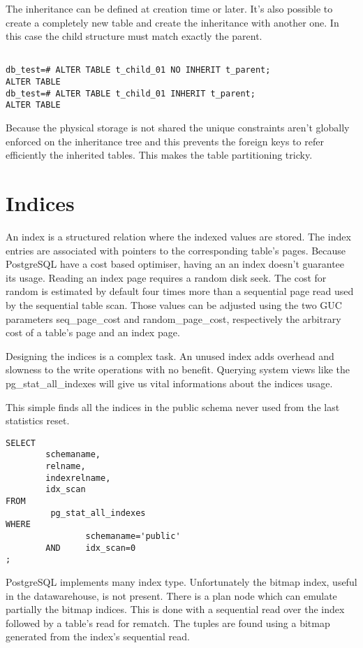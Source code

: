 The inheritance can be defined at creation time or later. It's also possible to create a completely 
new table and create the inheritance with another one. In this case the child structure must match 
exactly the parent.

\begin{lstlisting}[style=pgsql]

db_test=# ALTER TABLE t_child_01 NO INHERIT t_parent;
ALTER TABLE
db_test=# ALTER TABLE t_child_01 INHERIT t_parent;
ALTER TABLE

\end{lstlisting}

Because the physical storage is not shared the unique constraints aren't globally enforced on the 
inheritance tree and this prevents the foreign keys to refer efficiently the inherited tables. This 
makes the table partitioning tricky.

\section{Indices}
An index is a structured relation where the indexed values are stored. The index entries are 
associated with pointers to the corresponding table's pages. Because PostgreSQL have a cost based 
optimiser, having an an index doesn't guarantee its usage. Reading an index page requires a random
disk seek. The cost for random is estimated by default four times more than a sequential page read
used by the sequential table scan. Those values can be adjusted using the two GUC parameters
seq\_page\_cost and random\_page\_cost, respectively the arbitrary cost of a table's page and an
index page. \newline

Designing the indices is a complex task. An unused index adds overhead and slowness to the write
operations with no benefit. Querying system views like the pg\_stat\_all\_indexes will give us
vital informations about the indices usage.

This simple finds all the indices in the public schema never used from the last statistics 
reset.

\begin{lstlisting}[style=pgsql]
SELECT
        schemaname,
        relname,
        indexrelname,
        idx_scan
FROM
         pg_stat_all_indexes
WHERE
                schemaname='public'
        AND     idx_scan=0
;

\end{lstlisting}


PostgreSQL implements many index type. Unfortunately the bitmap index, useful in the datawarehouse,
is not present. There is a plan node which can emulate partially the bitmap indices. This is
done with a sequential read over the index followed by a table's read for rematch. The tuples
are found using a bitmap generated from the index's sequential read.\newline 


